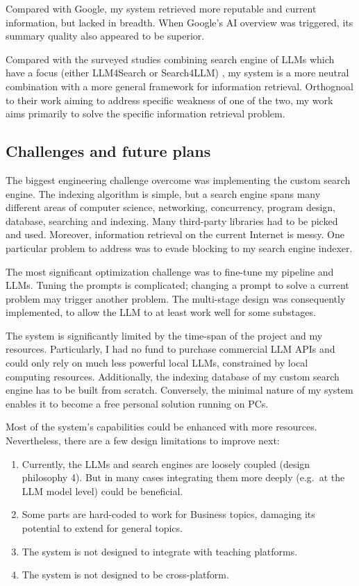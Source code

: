\documentclass[final-report]{report-template}
\begin{document}
Compared with Google, my system retrieved more reputable and current
information, but lacked in breadth. When Google's AI overview was triggered,
its summary quality also appeared to be superior.

Compared with the surveyed studies combining search engine of LLMs which have a
focus (either LLM4Search or Search4LLM) \cite{llm.meet.search.1}, my system is
a more neutral combination with a more general framework for information
retrieval. Orthognoal to their work aiming to address specific weakness of one
of the two, my work aims primarily to solve the specific information retrieval
problem.

\subsection{Challenges and future plans}
The biggest engineering challenge overcome was implementing the custom search
engine. The indexing algorithm is simple, but a search engine spans
many different areas of computer science, networking, concurrency, program
design, database, searching and indexing. Many third-party libraries had to be
picked and used. Moreover, information retrieval on the current Internet is
messy. One particular problem to address was to evade blocking to my search
engine indexer.

The most significant optimization challenge was to fine-tune my pipeline and
LLMs. Tuning the prompts is complicated; changing a prompt to solve a current
problem may trigger another problem. The multi-stage design was consequently
implemented, to allow the LLM to at least work well for some substages.

The system is significantly limited by the time-span of the project and my
resources. Particularly, I had no fund to purchase commercial LLM APIs and
could only rely on much less powerful local LLMs, constrained by local
computing resources. Additionally, the indexing database of my custom search
engine has to be built from scratch. Conversely, the minimal nature of my
system enables it to become a free personal solution running on PCs.

Most of the system's capabilities could be enhanced with more resources.
Nevertheless, there are a few design limitations to improve next: 
\begin{enumerate}
	\item Currently, the LLMs and search engines are loosely coupled (design
		philosophy 4). But in many cases integrating them more deeply (e.g.\ at
		the LLM model level) could be beneficial.
	\item Some parts are hard-coded to work for Business topics, damaging its
		potential to extend for general topics.
	\item The system is not designed to integrate with teaching platforms.
	\item The system is not designed to be cross-platform.
\end{enumerate}
\end{document}
